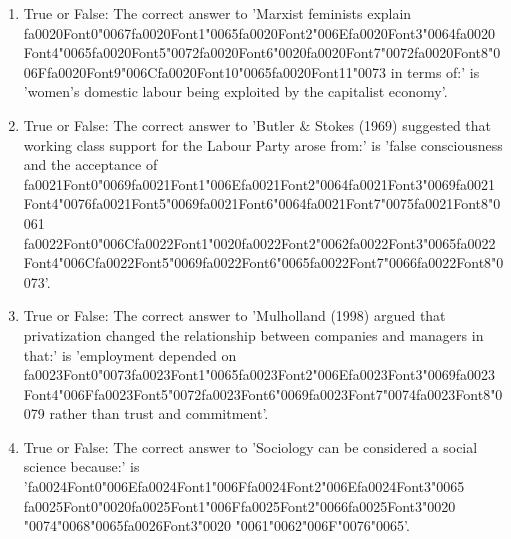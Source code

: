 \documentclass[12pt]{article}
\begin{document}
\begin{enumerate}[label=\arabic*.]
\item True or False: The correct answer to 'Marxist feminists explain {\csname fa0020Font0\endcsname\char"0067}{\csname fa0020Font1\endcsname\char"0065}{\csname fa0020Font2\endcsname\char"006E}{\csname fa0020Font3\endcsname\char"0064}{\csname fa0020Font4\endcsname\char"0065}{\csname fa0020Font5\endcsname\char"0072}{\csname fa0020Font6\endcsname\char"0020}{\csname fa0020Font7\endcsname\char"0072}{\csname fa0020Font8\endcsname\char"006F}{\csname fa0020Font9\endcsname\char"006C}{\csname fa0020Font10\endcsname\char"0065}{\csname fa0020Font11\endcsname\char"0073} in terms of:' is 'women's domestic labour being exploited by the capitalist economy'.
\item True or False: The correct answer to 'Butler \& Stokes (1969) suggested that working class support for the Labour Party arose from:' is 'false consciousness and the acceptance of {\csname fa0021Font0\endcsname\char"0069}{\csname fa0021Font1\endcsname\char"006E}{\csname fa0021Font2\endcsname\char"0064}{\csname fa0021Font3\endcsname\char"0069}{\csname fa0021Font4\endcsname\char"0076}{\csname fa0021Font5\endcsname\char"0069}{\csname fa0021Font6\endcsname\char"0064}{\csname fa0021Font7\endcsname\char"0075}{\csname fa0021Font8\endcsname\char"0061} {\csname fa0022Font0\endcsname\char"006C}{\csname fa0022Font1\endcsname\char"0020}{\csname fa0022Font2\endcsname\char"0062}{\csname fa0022Font3\endcsname\char"0065}{\csname fa0022Font4\endcsname\char"006C}{\csname fa0022Font5\endcsname\char"0069}{\csname fa0022Font6\endcsname\char"0065}{\csname fa0022Font7\endcsname\char"0066}{\csname fa0022Font8\endcsname\char"0073}'.
\item True or False: The correct answer to 'Mulholland (1998) argued that privatization changed the relationship between companies and managers in that:' is 'employment depended on {\csname fa0023Font0\endcsname\char"0073}{\csname fa0023Font1\endcsname\char"0065}{\csname fa0023Font2\endcsname\char"006E}{\csname fa0023Font3\endcsname\char"0069}{\csname fa0023Font4\endcsname\char"006F}{\csname fa0023Font5\endcsname\char"0072}{\csname fa0023Font6\endcsname\char"0069}{\csname fa0023Font7\endcsname\char"0074}{\csname fa0023Font8\endcsname\char"0079} rather than trust and commitment'.
\item True or False: The correct answer to 'Sociology can be considered a social science because:' is '{\csname fa0024Font0\endcsname\char"006E}{\csname fa0024Font1\endcsname\char"006F}{\csname fa0024Font2\endcsname\char"006E}{\csname fa0024Font3\endcsname\char"0065} {\csname fa0025Font0\endcsname\char"0020}{\csname fa0025Font1\endcsname\char"006F}{\csname fa0025Font2\endcsname\char"0066}{\csname fa0025Font3\endcsname\char"0020} {\char"0074}{\char"0068}{\char"0065}{\csname fa0026Font3\endcsname\char"0020} {\char"0061}{\char"0062}{\char"006F}{\char"0076}{\char"0065}'.

\end{enumerate}
\end{document}
